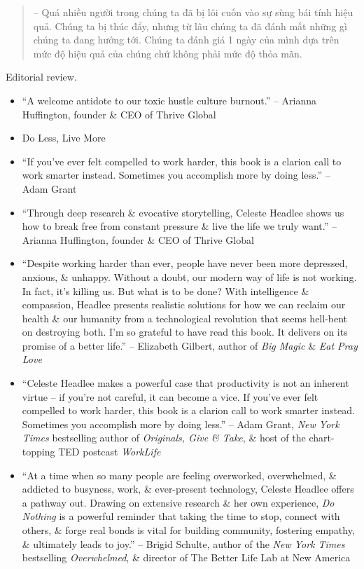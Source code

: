 \documentclass{article}
\begin{document}
\begin{enumerate}
\begin{quotation}
		-- Quá nhiều người trong chúng ta đã bị lôi cuốn vào sự sùng bái tính hiệu quả. Chúng ta bị thúc đẩy, nhưng từ lâu chúng ta đã đánh mất những gì chúng ta đang hướng tới. Chúng ta đánh giá 1 ngày của mình dựa trên mức độ hiệu quả của chúng chứ không phải mức độ thỏa mãn.
	\end{quotation}
	{\sf Editorial review.}
	\begin{itemize}
		\item ``A welcome antidote to our toxic hustle culture burnout.'' -- {\sc Arianna Huffington}, founder \& CEO of Thrive Global
		\item Do Less, Live More
		\item ``If you've ever felt compelled to work harder, this book is a clarion call to work smarter instead. Sometimes you accomplish more by doing less.'' -- {\sc Adam Grant}
		\item ``Through deep research \& evocative storytelling, {\sc Celeste Headlee} shows us how to break free from constant pressure \& live the life we truly want.'' -- {\sc Arianna Huffington}, founder \& CEO of Thrive Global
		\item ``Despite working harder than ever, people have never been more depressed, anxious, \& unhappy. Without a doubt, our modern way of life is not working. In fact, it's killing us. But what is to be done? With intelligence \& compassion, {\sc Headlee} presents realistic solutions for how we can reclaim our health \& our humanity from a technological revolution that seems hell-bent on destroying both. I'm so grateful to have read this book. It delivers on its promise of a better life.'' -- {\sc Elizabeth Gilbert}, author of {\it Big Magic} \& {\it Eat Pray Love}
		\item ``{\sc Celeste Headlee} makes a powerful case that productivity is not an inherent virtue -- if you're not careful, it can become a vice. If you've ever felt compelled to work harder, this book is a clarion call to work smarter instead. Sometimes you accomplish more by doing less.'' -- {\sc Adam Grant}, {\it New York Times} bestselling author of {\it Originals, Give \& Take}, \& host of the chart-topping TED postcast {\it WorkLife}
		\item ``At a time when so many people are feeling overworked, overwhelmed, \& addicted to busyness, work, \& ever-present technology, {\sc Celeste Headlee} offers a pathway out. Drawing on extensive research \& her own experience, {\it Do Nothing} is a powerful reminder that taking the time to stop, connect with others, \& forge real bonds is vital for building community, fostering empathy, \& ultimately leads to joy.'' -- {\sc Brigid Schulte}, author of the {\it New York Times} bestselling {\it Overwhelmed}, \& director of The Better Life Lab at New America

\end{itemize}
\end{enumerate}
\end{document}
